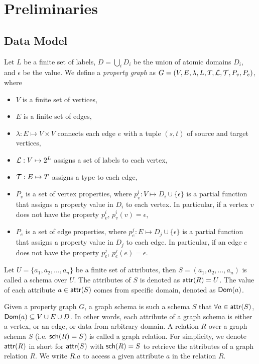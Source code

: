\section{Preliminaries}
\label{sec:preliminaries}

\subsection{Data Model}
Let $L$ be a finite set of labels, $D = \bigcup_i D_i$ be the union of atomic domains $D_i$, and $\epsilon$ be the  value. We define a \textit{property graph} as $G = (V, E, \lambda, L, T, \mathcal{L}, \mathcal{T}, P_v, P_e)$, where
\begin{itemize}
    \item $V$ is a finite set of vertices,
    \item $E$ is a finite set of edges,
    \item $\lambda: E \mapsto V \times V$ connects each edge $e$ with a tuple $(s, t)$ of source and target vertices,
    \item $\mathcal{L}: V \mapsto 2^L$ assigns a set of labels to each vertex,
    \item $\mathcal{T}: E \mapsto T$ assigns a type to each edge,
    \item $P_v$ is a set of vertex properties, where $p_v^i: V \mapsto D_i \cup \{\epsilon\}$ is a partial function that assigns a property value in $D_i$ to each vertex. 
    In particular, if a vertex $v$ does not have the property $p_v^i$, $p_v^i(v) = \epsilon$,
    \item $P_e$ is a set of edge properties, where $p_e^j: E \mapsto D_j \cup \{\epsilon\}$ is a partial function that assigns a property value in $D_j$ to each edge. 
    In particular, if an edge $e$ does not have the property $p_e^j$, $p_e^j(e) = \epsilon$.
\end{itemize}

Let $U = \{a_1, a_2, \ldots, a_n\}$ be a finite set of attributes, then $S = (a_1, a_2, \ldots, a_n)$ is called a schema over $U$. 
The attributes of $S$ is denoted as ${\mathsf{attr}}(R) = U$. The value of each attribute $a \in {\ensuremath {\mathsf{attr}}}(S)$ comes from specific domain, denoted as ${\mathsf{Dom}}(a)$.

Given a property graph $G$, a graph schema is such a schema $S$ that $\forall a \in {\ensuremath {\mathsf{attr}}}(S)$, ${\mathsf{Dom}}(a) \subseteq V \cup E \cup D$. 
In other words, each attribute of a graph schema is either a vertex, or an edge, or data from arbitrary domain. 
A relation $R$ over a graph schema $S$ (i.e. ${\mathsf{sch}}(R) = S$) is called a graph relation. 
For simplicity, we denote ${\mathsf{attr}}(R)$ in short for ${\mathsf{attr}}(S)$ with ${\mathsf{sch}}(R) = S$ to retrieve the attributes of a graph relation $R$. 
We write $R.a$ to access a given attribute $a$ in the relation $R$. 

